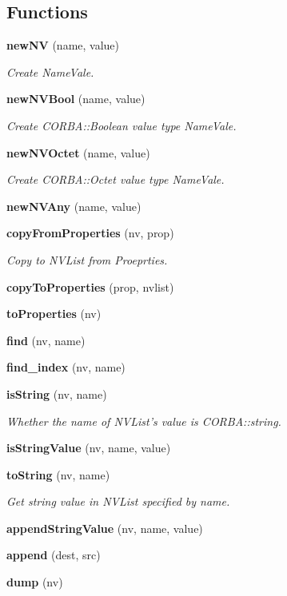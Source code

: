 \subsection*{Functions}
\begin{CompactItemize}
\item 
{\bf new\-NV} (name, value)
\begin{CompactList}\small\item\em Create Name\-Vale. \item\end{CompactList}\item 
{\bf new\-NVBool} (name, value)
\begin{CompactList}\small\item\em Create CORBA::Boolean value type Name\-Vale. \item\end{CompactList}\item 
{\bf new\-NVOctet} (name, value)
\begin{CompactList}\small\item\em Create CORBA::Octet value type Name\-Vale. \item\end{CompactList}\item 
{\bf new\-NVAny} (name, value)
\item 
{\bf copy\-From\-Properties} (nv, prop)
\begin{CompactList}\small\item\em Copy to NVList from Proeprties. \item\end{CompactList}\item 
{\bf copy\-To\-Properties} (prop, nvlist)
\item 
{\bf to\-Properties} (nv)
\item 
{\bf find} (nv, name)
\item 
{\bf find\_\-index} (nv, name)
\item 
{\bf is\-String} (nv, name)
\begin{CompactList}\small\item\em Whether the name of NVList's value is CORBA::string. \item\end{CompactList}\item 
{\bf is\-String\-Value} (nv, name, value)
\item 
{\bf to\-String} (nv, name)
\begin{CompactList}\small\item\em Get string value in NVList specified by name. \item\end{CompactList}\item 
{\bf append\-String\-Value} (nv, name, value)
\item 
{\bf append} (dest, src)
\item 
{\bf dump} (nv)
\end{CompactItemize}


